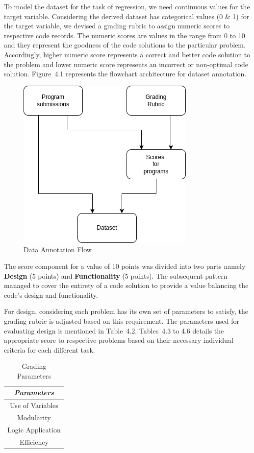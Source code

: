 To model the dataset for the task of regression, we need
continuous values for the target variable. Considering the
derived dataset has categorical values (0 \& 1) for the
target variable, we devised a grading rubric to assign
numeric scores to respective code records. The numeric scores
are values in the range from 0 to 10 and they represent the
goodness of the code solutions to the particular
problem. Accordingly, higher numeric score represents a
correct and better code solution to the problem and lower
numeric score represents an incorrect or non-optimal code
solution.  Figure~4.1 represents the flowchart architecture
for dataset annotation.

\begin{figure}[h]
\centering
\includegraphics{./figures/data.png}
\caption{Data Annotation Flow}
\label{fig1}
\end{figure}

The score component for a value of 10 points was divided into
two parts namely \textbf{Design} (5 points) and
\textbf{Functionality} (5 points). The subsequent pattern
managed to cover the entirety of a code solution to provide a
value balancing the code's design and functionality.


For design, considering each problem has its own set of
parameters to satisfy, the grading rubric is adjusted based
on this requirement. The parameters used for evaluating
design is mentioned in Table~4.2. Tables~4.3 to 4.6 details
the appropriate score to respective problems based on their
necessary individual criteria for each different task.
        
        
\begin{table}[H]
\centering
\caption{Grading Parameters}
\begin{tabular}{|c|}
\hline
\emph{Parameters} \\ \hline
Use of Variables \\ \hline
Modularity \\ \hline
Logic Application \\ \hline
Efficiency \\ \hline
\end{tabular}

\label{tab:params}
\end{table}


